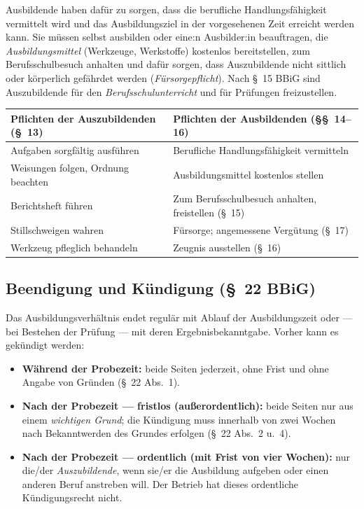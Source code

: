 \documentclass[11pt, a4paper]{article}
\begin{document}
Ausbildende haben dafür zu sorgen, dass die berufliche Handlungsfähigkeit vermittelt wird und
das Ausbildungsziel in der vorgesehenen Zeit erreicht werden kann. Sie müssen selbst
ausbilden oder eine:n Ausbilder:in beauftragen, die \emph{Ausbildungsmittel} (Werkzeuge,
Werkstoffe) kostenlos bereitstellen, zum Berufsschulbesuch anhalten und dafür sorgen, dass
Auszubildende nicht sittlich oder körperlich gefährdet werden (\emph{Fürsorgepflicht}). Nach
\S~15 BBiG sind Auszubildende für den \emph{Berufsschulunterricht} und für Prüfungen
freizustellen.

\begin{center}
\begin{tabular}{p{6.3cm} p{6.3cm}}
\toprule
\textbf{Pflichten der Auszubildenden (\S~13)} & \textbf{Pflichten der Ausbildenden (\S\S~14--16)}\\
\midrule
Aufgaben sorgfältig ausführen & Berufliche Handlungsfähigkeit vermitteln\\
Weisungen folgen, Ordnung beachten & Ausbildungsmittel kostenlos stellen\\
Berichtsheft führen & Zum Berufsschulbesuch anhalten, freistellen (\S~15)\\
Stillschweigen wahren & Fürsorge; angemessene Vergütung (\S~17)\\
Werkzeug pfleglich behandeln & Zeugnis ausstellen (\S~16)\\
\bottomrule
\end{tabular}
\end{center}

\subsection{Beendigung und Kündigung (\S~22 BBiG)}

Das Ausbildungsverhältnis endet regulär mit Ablauf der Ausbildungszeit oder --- bei Bestehen
der Prüfung --- mit deren Ergebnisbekanntgabe. Vorher kann es gekündigt werden:

\begin{itemize}
  \item \textbf{Während der Probezeit:} beide Seiten jederzeit, ohne Frist und ohne Angabe von
    Gründen (\S~22 Abs.~1).
  \item \textbf{Nach der Probezeit --- fristlos (außerordentlich):} beide Seiten nur aus einem
    \emph{wichtigen Grund}; die Kündigung muss innerhalb von zwei Wochen nach Bekanntwerden
    des Grundes erfolgen (\S~22 Abs.~2 u.~4).
  \item \textbf{Nach der Probezeit --- ordentlich (mit Frist von vier Wochen):} nur die/der
    \emph{Auszubildende}, wenn sie/er die Ausbildung aufgeben oder einen anderen Beruf
    anstreben will. Der Betrieb hat dieses ordentliche Kündigungsrecht nicht.
\end{itemize}
\end{document}
